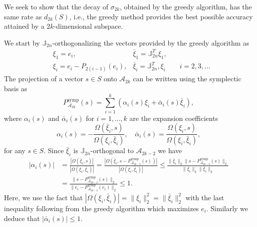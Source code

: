 We seek to show that the decay of $\sigma_{2k}$, obtained by the greedy algorithm, has the same rate as $d_{2k}(S)$, i.e., the greedy method provides the best possible accuracy attained by a $2k$-dimensional subspace.

We start by $\mathbb J_{2n}$-orthogonalizing the vectors provided by the greedy algorithm as
\begin{equation} \label{eq:new6}
\begin{aligned}
	& \xi_1 = e_i, & \bar{\xi}_1 = \mathbb{J}_{2n}^T \xi_1, &\\
	& \xi_i = e_i - P_{2(i-1)} (e_i), & \bar{\xi}_i = \mathbb{J}_{2n}^T, \xi_i &\quad i = 2,3,\dots
\end{aligned}
\end{equation}
The projection of a vector $s\in S$ onto $\mathcal A_{2k}$ can be written using the symplectic basis as
\begin{equation} \label{eq:new7}
	P_{\mathcal A_{2k}}^{\text{symp}}(s) = \sum_{i=1}^k \left( \alpha_i(s) \xi_i + \bar{\alpha}_i(s) \bar{\xi}_i \right),
\end{equation}
where $\alpha_i(s)$ and $\bar{\alpha}_i(s)$ for $i=1,\dots,k$ are the expansion coefficients
\begin{equation} \label{eq:new8}
	\alpha_i(s) = - \frac{\Omega(\bar{\xi}_i,s)}{\Omega(\xi_i,\bar{\xi}_i)}, \quad \bar{\alpha}_i(s) = \frac{\Omega(\xi_i,s)}{\Omega(\xi_i,\bar{\xi}_i)},
\end{equation}
for any $s\in S$. Since $\bar{\xi}_i$ is $\mathbb J_{2n}$-orthogonal to $\mathcal A_{2k-2}$ we have
\begin{equation} \label{eq:new9}
\begin{aligned}
	|\alpha_i(s)| &= \frac{|\Omega(\bar{\xi}_i,s)|}{|\Omega(\xi_i,\bar{\xi}_i)|} = \frac{|\Omega( \bar{\xi}_i, s - P_{\mathcal A_{2k-2}}^{\text{symp}}(s))|}{|\Omega(\xi_i,\bar{\xi}_i)|}  \leq \frac{\|\bar{\xi}_i\|_2 \| s - P_{\mathcal A_{2k-2}}^{\text{symp}}(s) \|_2}{ \|\xi_i\|_2 \|\bar{\xi}_i\|_2 } \\
	&= \frac{\| s - P_{\mathcal A_{2k-2}}^{\text{symp}}(s) \|_2}{\| e_i - P_{\mathcal A_{2k-2}}^{\text{symp}}(e_i) \|_2} \leq 1.
\end{aligned}
\end{equation}
Here, we use the fact that $ |\Omega(\xi_i,\bar{\xi}_i)| = \| \xi_i \|^2_2 = \|\bar{\xi}_i\|^2_2$ with the last inequality following from the greedy algorithm which maximizes $e_i$. Similarly we deduce that $|\bar{\alpha}_i(s)|\leq 1$.

